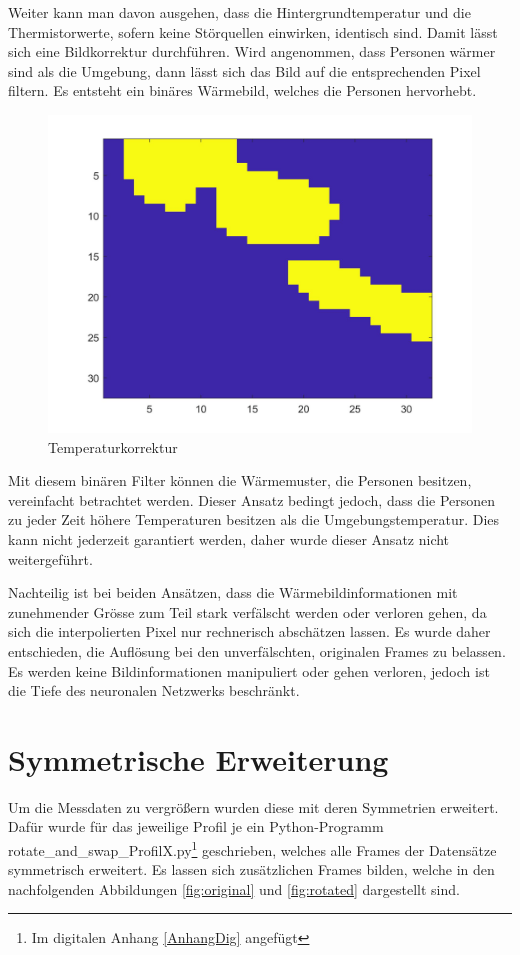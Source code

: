 Weiter kann man davon ausgehen, dass die Hintergrundtemperatur und die Thermistorwerte, sofern keine Störquellen einwirken, identisch sind. Damit lässt sich eine Bildkorrektur durchführen. Wird angenommen, dass Personen wärmer sind als die Umgebung, dann lässt sich das Bild auf die entsprechenden Pixel filtern. Es entsteht ein binäres Wärmebild, welches die Personen hervorhebt. 

\begin{figure}[H]
	\centering
	\includegraphics[width=0.5\linewidth]{fig/interpol_3}
    \caption[Temperaturkorrektur]{Temperaturkorrektur}
   \label{fig:interpol3}
\end{figure}

Mit diesem binären Filter können die Wärmemuster, die Personen besitzen, vereinfacht betrachtet werden. Dieser Ansatz bedingt jedoch, dass die Personen zu jeder Zeit höhere Temperaturen besitzen als die Umgebungstemperatur. Dies kann nicht jederzeit garantiert werden, daher wurde dieser Ansatz nicht weitergeführt.

Nachteilig ist bei beiden Ansätzen, dass die Wärmebildinformationen mit zunehmender Grösse zum Teil stark verfälscht werden oder verloren gehen, da sich die interpolierten Pixel nur rechnerisch abschätzen lassen. Es wurde daher entschieden, die Auflösung bei den unverfälschten, originalen Frames zu belassen. Es werden keine Bildinformationen manipuliert oder gehen verloren, jedoch ist die Tiefe des neuronalen Netzwerks beschränkt.

\section{Symmetrische Erweiterung}
\label{sec:Symmetrische Erweiterung}

Um die Messdaten zu vergrößern wurden diese mit deren Symmetrien erweitert. Dafür wurde für das jeweilige Profil je ein Python-Programm rotate\_and\_swap\_ProfilX.py\footnote[24]{Im digitalen Anhang \ref{AnhangDig} angefügt}  geschrieben, welches alle Frames der Datensätze symmetrisch erweitert. Es lassen sich zusätzlichen Frames bilden, welche in den nachfolgenden Abbildungen \ref{fig:original} und \ref{fig:rotated} dargestellt sind.

